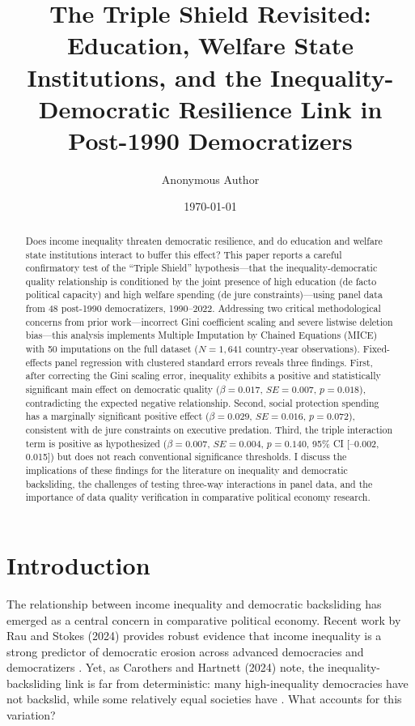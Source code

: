\documentclass[11pt,letterpaper]{article}
\title{The Triple Shield Revisited: Education, Welfare State Institutions, and the Inequality-Democratic Resilience Link in Post-1990 Democratizers}
\author{Anonymous Author}
\date{\today}
\begin{document}
\maketitle

\begin{abstract}
Does income inequality threaten democratic resilience, and do education and welfare state institutions interact to buffer this effect? This paper reports a careful confirmatory test of the ``Triple Shield'' hypothesis---that the inequality-democratic quality relationship is conditioned by the joint presence of high education (de facto political capacity) and high welfare spending (de jure constraints)---using panel data from 48 post-1990 democratizers, 1990--2022. Addressing two critical methodological concerns from prior work---incorrect Gini coefficient scaling and severe listwise deletion bias---this analysis implements Multiple Imputation by Chained Equations (MICE) with 50 imputations on the full dataset ($N = 1,641$ country-year observations). Fixed-effects panel regression with clustered standard errors reveals three findings. First, after correcting the Gini scaling error, inequality exhibits a positive and statistically significant main effect on democratic quality ($\beta = 0.017$, $SE = 0.007$, $p = 0.018$), contradicting the expected negative relationship. Second, social protection spending has a marginally significant positive effect ($\beta = 0.029$, $SE = 0.016$, $p = 0.072$), consistent with de jure constraints on executive predation. Third, the triple interaction term is positive as hypothesized ($\beta = 0.007$, $SE = 0.004$, $p = 0.140$, 95\% CI [--0.002, 0.015]) but does not reach conventional significance thresholds. I discuss the implications of these findings for the literature on inequality and democratic backsliding, the challenges of testing three-way interactions in panel data, and the importance of data quality verification in comparative political economy research.
\end{abstract}

\newpage

\section{Introduction}

The relationship between income inequality and democratic backsliding has emerged as a central concern in comparative political economy. Recent work by Rau and Stokes (2024) provides robust evidence that income inequality is a strong predictor of democratic erosion across advanced democracies and democratizers \cite{Rau2024}. Yet, as Carothers and Hartnett (2024) note, the inequality-backsliding link is far from deterministic: many high-inequality democracies have not backslid, while some relatively equal societies have \cite{Carothers2024}. What accounts for this variation?
\end{document}
